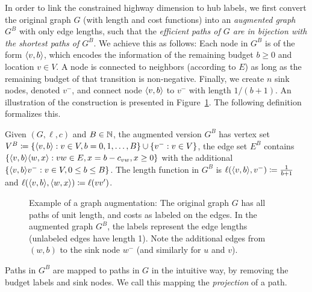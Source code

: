In order to link the constrained highway dimension to hub labels, we first convert the original graph $G$ (with length and cost functions) into an \emph{augmented graph} $G^B$ with only edge lengths, such that the \emph{efficient paths of $G$ are in bijection with the shortest paths of $G^B$}.
We achieve this as follows: Each node in $G^B$ is of the form $\pp{v,b}$, which encodes the information of the remaining budget $b\geq 0$ and location $v\in V$.
A node is connected to neighbors (according to $E$) as long as the remaining budget of that transition is non-negative.
Finally, we create $n$ sink nodes, denoted $v^-$, and connect node $\pp{v,b}$ to $v^-$ with length $1/(b+1)$.
An illustration of the construction is presented in Figure~\ref{fig:augmented}.
The following definition formalizes this. 

\begin{definition}
Given $(G,\ell,c)$ and $B\in\N$, the augmented version $G^B$ has vertex set\\
$V^B \defeq\crl*{\pp{v,b}: v\in V, b=0,1,\ldots,B}\cup\crl*{v^-:v\in V}$, the edge set $E^B$ contains $\crl*{\pp{v,b}\pp{w,x} : vw\in E, x=b-c_{vw}, x\geq 0}$ with the additional $\crl*{\pp{v,b}v^-: v\in V, 0\leq b\leq B}$.
The length function in $G^B$ is $\ell(\pp{v,b},v^-) \defeq \frac{1}{b+1}$ and $\ell(\pp{v,b},\pp{w,x}) \defeq \ell(vv')$.
\end{definition}

\begin{figure}

\caption{Example of a graph augmentation: The original graph $G$ has all paths of unit length, and costs as labeled on the edges. In the augmented graph $G^B$, the labels represent the edge lengths (unlabeled edges have length 1). Note the additional edges from $(w,b)$ to the sink node $w^-$ (and similarly for $u$ and $v$). 
}
\label{fig:augmented}
\end{figure}

Paths in $G^B$ are mapped to paths in $G$ in the intuitive way, by removing the budget labels and sink nodes.
We call this mapping the \emph{projection} of a path.


